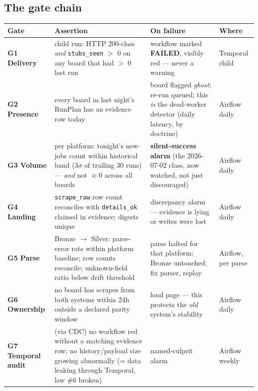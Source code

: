 \documentclass[11pt,a4paper]{article}
\newcommand{\gate}[1]{\textbf{\textcolor{red!60!black}{#1}}}
\begin{document}
\subsection{The gate chain}
\begin{center}
\begin{tabularx}{\textwidth}{@{}lXXl@{}}
\toprule
Gate & Assertion & On failure & Where \\
\midrule
\gate{G1 Delivery} & child run: HTTP 200-class \emph{and} \texttt{stubs\_seen} $>$ 0 on any board that had
$>$ 0 last run & workflow marked \textbf{FAILED}, visibly red --- never a warning & Temporal child \\
\addlinespace
\gate{G2 Presence} & every board in last night's RunPlan has an evidence row today & board flagged
\emph{ghost}; re-run queued; this \emph{is} the dead-worker detector (daily latency, by doctrine) &
Airflow daily \\
\addlinespace
\gate{G3 Volume} & per platform: tonight's new-jobs count within historical band ($3\sigma$ of trailing 30
runs) --- \emph{and} not $\approx$0 across all boards & \textbf{silent-success alarm} (the 2026-07-02
class, now watched, not just discouraged) & Airflow daily \\
\addlinespace
\gate{G4 Landing} & \texttt{scrape\_raw} row count reconciles with \texttt{details\_ok} claimed in
evidence; digests unique & discrepancy alarm --- evidence is lying or writes were lost & Airflow daily \\
\addlinespace
\gate{G5 Parse} & Bronze $\rightarrow$ Silver: parse-error rate within platform baseline; row counts
reconcile; unknown-field ratio below drift threshold & parse halted for that platform; Bronze untouched;
fix parser, replay & Airflow, per parse \\
\addlinespace
\gate{G6 Ownership} & no board has scrapes from both systems within 24h outside a declared parity window &
loud page --- this protects the \emph{old} system's stability & Airflow daily \\
\addlinespace
\gate{G7 Temporal audit} & (via CDC) no workflow red without a matching evidence row; no history/payload
size growing abnormally (= data leaking through Temporal, law \#6 broken) & named-culprit alarm & Airflow
weekly \\
\bottomrule
\end{tabularx}
\end{center}
\end{document}
